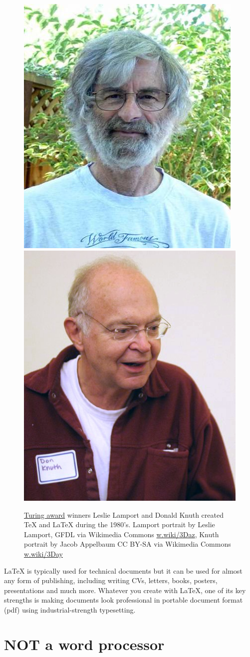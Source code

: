 \documentclass[
]{book}
\begin{document}
\begin{figure}
\includegraphics[width=0.47\linewidth]{images/Leslie_Lamport} \includegraphics[width=0.47\linewidth]{images/KnuthAtOpenContentAlliance} \caption{\href{https://en.wikipedia.org/wiki/Turing_Award}{Turing award} winners Leslie Lamport and Donald Knuth created TeX and LaTeX during the 1980's. Lamport portrait by Leslie Lamport, GFDL via Wikimedia Commons \href{https://w.wiki/3Daz}{w.wiki/3Daz}, Knuth portrait by Jacob Appelbaum CC BY-SA via Wikimedia Commons \href{https://w.wiki/3Day}{w.wiki/3Day}}\label{fig:knuthport-fig}
\end{figure}



LaTeX is typically used for technical documents but it can be used for almost any form of publishing, including writing CVs, letters, books, posters, presentations and much more. Whatever you create with LaTeX, one of its key strengths is making documents look professional in portable document format (pdf) using industrial-strength typesetting.

\hypertarget{not-a-word-processor}{%
\section{NOT a word processor}\label{not-a-word-processor}}
\end{document}
